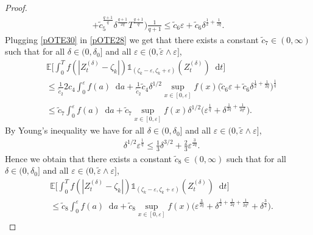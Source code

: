 \documentclass[11pt,a4paper]{article}
\numberwithin{equation}{section}
\theoremstyle{definition}
\newcommand{\E}{{\mathbb{E}}}
\newcommand{\diff}{\mathop{}\!\mathrm{d}}
\begin{document}
\begin{proof}
\begin{equation}
\begin{aligned}
        +  \widetilde c_5^{\frac{q+1}{q}}  \delta^{\frac{q+1}{2q}} T^{\frac{q+1}{q}} \Big)\frac{1}{q+1}
        \leq \widetilde c_6 \varepsilon + \widetilde c_6 \delta^{\frac{1}{2}+ \frac{1}{2q}}.
    \end{aligned}
\end{equation}
Plugging \eqref{pOTE30} in \eqref{pOTE28} we get that there exists a constant $\widetilde c_{7}\in(0,\infty)$ such that for all $\delta\in(0,\delta_0]$ and all $\varepsilon\in(0,\widetilde \varepsilon\wedge \varepsilon]$,
\begin{equation}\label{pOTE31}
    \begin{aligned}
        &\E\Big[\int_0^T f(|Z^{(\delta)}_{t}-\zeta_k|)\mathds{1}_{(\zeta_k-\varepsilon, \zeta_k+\varepsilon)}(Z^{(\delta)}_{t}) \diff 
        t \Big]\\
        &\leq \frac{1}{\widetilde c_2}2 c_4\int_0^{\varepsilon} f(a) \diff a
        +  \frac{1}{\widetilde c_2}  \widetilde c_4 \delta^{1/2} \sup_{x\in[0,\varepsilon]} f(x)  \Big(\widetilde c_6 \varepsilon + \widetilde c_6 \delta^{\frac{1}{2}+ \frac{1}{2q}} \Big)^\frac{1}{q}  \\
        &\leq \widetilde c_{7}\int_0^{\varepsilon} f(a) \diff a
        +  \widetilde c_{7} \sup_{x\in[0,\varepsilon]} f(x)  \delta^{1/2} \Big(\varepsilon^\frac{1}{q} + \delta^{\frac{1}{2q}+ \frac{1}{2q^2}} \Big).
    \end{aligned}
\end{equation}
By Young's inequality we have for all $\delta\in(0,\delta_0]$ and all $\varepsilon\in(0,\widetilde \varepsilon\wedge \varepsilon]$,
\begin{equation}\label{pOTE32}
    \begin{aligned}
        & \delta^{1/2}\varepsilon^\frac{1}{q} \leq \frac{1}{3}\delta^{3/2} + \frac{2}{3}\varepsilon^{\frac{3}{2q}}.
    \end{aligned}
\end{equation}
Hence we obtain that there exists a constant $\widetilde c_{8}\in(0,\infty)$ such that for all $\delta\in(0,\delta_0]$ and all $\varepsilon\in(0,\widetilde \varepsilon\wedge \varepsilon]$,
\begin{equation}\label{pOTE33}
    \begin{aligned}
        &\E\Big[\int_0^T f(|Z^{(\delta)}_{t}-\zeta_k|)\mathds{1}_{(\zeta_k-\varepsilon, \zeta_k+\varepsilon)}(Z^{(\delta)}_{t}) \diff 
        t \Big]\\
        &\leq \widetilde c_{8}\int_0^{\varepsilon} f(a) \diff a
        +  \widetilde c_{8} \sup_{x\in[0,\varepsilon]} f(x) \Big(\varepsilon^\frac{3}{2q} + \delta^{\frac{1}{2}+\frac{1}{2q}+ \frac{1}{2q^2}} +\delta^\frac{3}{2} \Big).

\end{aligned}
\end{equation}
\end{proof}
\end{document}

